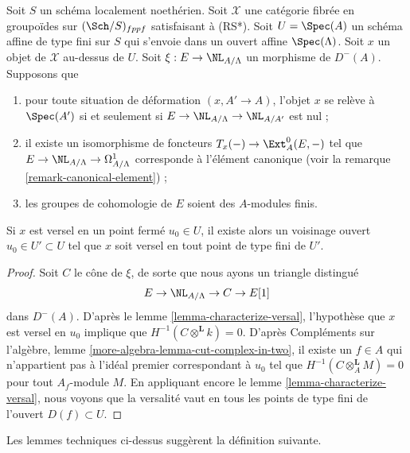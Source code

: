 \begin{lemma}
\label{lemma-openness}
Soit $S$ un schéma localement noethérien. Soit $\mathcal{X}$ une catégorie
fibrée en groupoïdes sur $(\Sch/S)_{fppf}$ satisfaisant à (RS*). Soit
$U = \Spec(A)$ un schéma affine de type fini sur $S$ qui s'envoie dans un
ouvert affine $\Spec(\Lambda)$. Soit $x$ un objet de $\mathcal{X}$ au-dessus
de $U$. Soit $\xi : E \to \NL_{A/\Lambda}$ un morphisme de $D^{-}(A)$.
Supposons que
\begin{enumerate}
\item[(i)] pour toute situation de déformation $(x, A' \to A)$, l'objet $x$
se relève à $\Spec(A')$ si et seulement si
$E \to \NL_{A/\Lambda} \to \NL_{A/A'}$ est nul ;
\item[(ii)] il existe un isomorphisme de foncteurs
$T_x(-) \to \Ext^0_A(E, -)$
tel que $E \to \NL_{A/\Lambda} \to \Omega^1_{A/\Lambda}$ corresponde à
l'élément canonique (voir la remarque \ref{remark-canonical-element}) ;
\item[(iii)] les groupes de cohomologie de $E$ soient des $A$-modules finis.
\end{enumerate}
Si $x$ est versel en un point fermé $u_0 \in U$, il existe alors un voisinage
ouvert $u_0 \in U' \subset U$ tel que $x$ soit versel en tout point de type
fini de $U'$.
\end{lemma}

\begin{proof}
Soit $C$ le cône de $\xi$, de sorte que nous ayons un triangle distingué
$$
E \to \NL_{A/\Lambda} \to C \to E[1]
$$
dans $D^{-}(A)$. D'après le lemme \ref{lemma-characterize-versal}, l'hypothèse
que $x$ est versel en $u_0$ implique que
$H^{-1}(C \otimes^\mathbf{L} k) = 0$. D'après Compléments sur l'algèbre, lemme
\ref{more-algebra-lemma-cut-complex-in-two}, il existe un $f \in A$ qui
n'appartient pas à l'idéal premier correspondant à $u_0$ tel que
$H^{-1}(C \otimes^\mathbf{L}_A M) = 0$ pour tout $A_f$-module $M$. En
appliquant encore le lemme \ref{lemma-characterize-versal}, nous voyons que la
versalité vaut en tous les points de type fini de l'ouvert $D(f) \subset U$.
\end{proof}

\noindent
Les lemmes techniques ci-dessus suggèrent la définition suivante.

